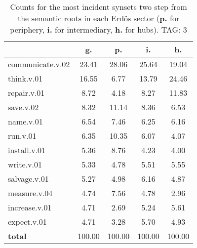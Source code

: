 \begin{table}[h!]
\begin{center}
\begin{tabular}{| l | c | c | c | c |}\hline
 & g. & p. & i. & h. \\\hline
communicate.v.02 & 23.41  & 28.06  & 25.64  & 19.04 \\\hline
think.v.01 & 16.55  & 6.77  & 13.79  & 24.46 \\\hline
repair.v.01 & 8.72  & 4.18  & 8.27  & 11.83 \\\hline
save.v.02 & 8.32  & 11.14  & 8.36  & 6.53 \\\hline
name.v.01 & 6.54  & 7.46  & 6.25  & 6.16 \\\hline
run.v.01 & 6.35  & 10.35  & 6.07  & 4.07 \\\hline
install.v.01 & 5.36  & 8.76  & 4.23  & 4.00 \\\hline
write.v.01 & 5.33  & 4.78  & 5.51  & 5.55 \\\hline
salvage.v.01 & 5.27  & 4.98  & 6.16  & 4.87 \\\hline
measure.v.04 & 4.74  & 7.56  & 4.78  & 2.96 \\\hline
increase.v.01 & 4.71  & 2.69  & 5.24  & 5.61 \\\hline
expect.v.01 & 4.71  & 3.28  & 5.70  & 4.93 \\\hline
{{\bf total}} & 100.00  & 100.00  & 100.00  & 100.00 \\\hline
\end{tabular}
\caption{Counts for the most incident synsets two step from the semantic roots in each Erd\"os sector ({\bf p.} for periphery, {\bf i.} for intermediary, {\bf h.} for hubs). TAG: 3}
\end{center}
\end{table}